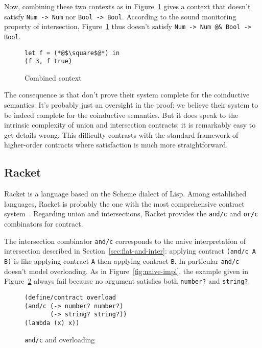\documentclass[sigplan,10pt]{acmart}
\newcommand{\nickel}[1]{\lstinline[language=nickel]{#1}}
\newcommand{\racket}[1]{\lstinline[language=racket]{#1}}
\begin{document}
Now, combining these two contexts as in Figure~\ref{fig:invalid-context} gives a context
that doesn't satisfy \nickel{Num -> Num} nor \hbox{\nickel{Bool -> Bool}.}  According
to the sound monitoring property of intersection, Figure~\ref{fig:invalid-context} thus doesn't satisfy \nickel{Num
-> Num @& Bool -> Bool}.

\begin{figure}[h]
\begin{lstlisting}[language=nickel]
let f = (*@$\square$@*) in
(f 3, f true)
\end{lstlisting}
\caption{Combined context}
\label{fig:invalid-context}
\end{figure}

The consequence is that \citeauthor{RootCauseOfBlame} don't prove their system
complete for the coinductive semantics.  It's probably just an oversight in the
proof: we believe their system to be indeed complete for the coinductive
semantics. But it does speak to the intrinsic complexity of union and
intersection contracts: it is remarkably easy to get details wrong.  This
difficulty contrasts with the standard framework of higher-order contracts where
satisfaction is much more straightforward.

\subsection{Racket}
\label{sec:racket}

Racket is a language based on the Scheme dialect of Lisp. Among established
languages, Racket is probably the one with the most comprehensive contract
system~\cite{RacketContracts}. Regarding union and intersections, Racket provides
the \racket{and/c} and \racket{or/c} combinators for contract.

The
intersection combinator \racket{and/c} corresponds to the naive
interpretation of intersection described in
Section~\ref{sec:flat-and-inter}: applying contract \racket{(and/c A
  B)} is like applying contract \racket{A} then applying contract \racket{B}. In
particular \racket{and/c} doesn't model overloading. As in
Figure~\ref{fig:naive-impl}, the example given in
Figure~\ref{fig:racket-overloading} always fail because no argument satisfies
both \racket{number?} and \racket{string?}.

\begin{figure}[h]
\begin{lstlisting}[language=racket]
(define/contract overload
(and/c (-> number? number?)
       (-> string? string?))
(lambda (x) x))
\end{lstlisting}
\caption{\racket{and/c} and overloading}
\label{fig:racket-overloading}
\end{figure}
\end{document}
